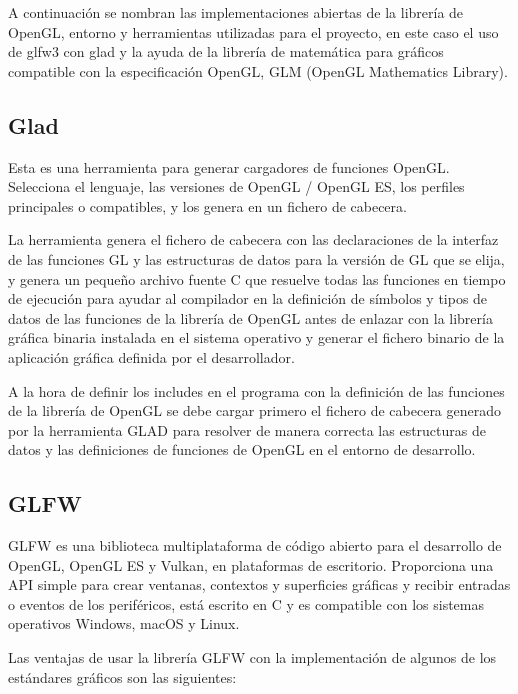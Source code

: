 \documentclass[a4paper, 17pt]{book}
\begin{document}
A continuación se nombran las implementaciones abiertas de la librería de OpenGL, entorno y herramientas 
utilizadas para el proyecto, en este caso el uso de glfw3 con glad y la ayuda de la librería de matemática
para gráficos compatible con la especificación OpenGL, GLM (OpenGL Mathematics Library).

\subsection{Glad} 
\label{subsec:Glad}

Esta es una herramienta para generar cargadores de funciones OpenGL. Selecciona el lenguaje, las versiones
de OpenGL / OpenGL ES, los perfiles principales o compatibles, y los genera en un fichero de cabecera.

La herramienta genera el fichero de cabecera con las declaraciones de la interfaz de las funciones GL y
las estructuras de datos para la versión de GL que se elija, y genera un pequeño archivo fuente C que
resuelve todas las funciones en tiempo de ejecución para ayudar al compilador en la definición de
símbolos y tipos de datos de las funciones de la librería de OpenGL antes de enlazar con la librería
gráfica binaria instalada en el sistema operativo y generar el fichero binario de la aplicación gráfica
definida por el desarrollador.

A la hora de definir los includes en el programa con la definición de las funciones de la librería de
OpenGL se debe cargar primero el fichero de cabecera generado por la herramienta GLAD para resolver de
manera correcta las estructuras de datos y las definiciones de funciones de OpenGL en el entorno de
desarrollo.

\subsection{GLFW} 
\label{subsec:GLFW}

GLFW es una biblioteca multiplataforma de código abierto para el desarrollo de OpenGL, OpenGL ES y Vulkan,
en plataformas de escritorio. Proporciona una API simple para crear ventanas, contextos y superficies
gráficas y recibir entradas o eventos de los periféricos, está escrito en C y es compatible con los sistemas
operativos Windows, macOS y Linux.

Las ventajas de usar la librería GLFW con la implementación de algunos de los estándares gráficos son
las siguientes:
\end{document}
